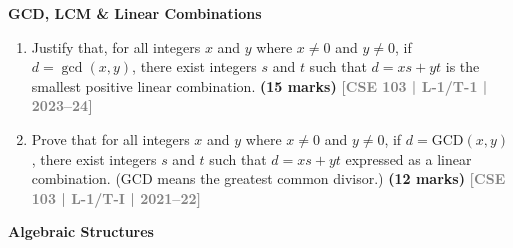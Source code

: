 \documentclass[12pt,a3paper]{article}
\newcommand{\yr}[1]{\hfill\textcolor{gray}{\small\textbf{[#1]}}}
\newcommand{\mk}[1]{\textcolor{orange!70!black}{\small\textbf{(#1 marks)}}}
\newcommand{\subtopic}[2]{%
  \vspace{10pt}
  \noindent\begin{tcolorbox}[colback=#1!8,colframe=#1,boxrule=0.6pt,arc=4pt,
    left=6pt,right=6pt,top=4pt,bottom=4pt]
    \small\bfseries\textcolor{#1}{#2}
  \end{tcolorbox}
  \vspace{2pt}
}
\begin{document}
\subtopic{cC}{GCD, LCM \& Linear Combinations}
\label{sub:s5-gcdlcm}

\begin{enumerate}

\item Justify that, for all integers $x$ and $y$ where $x \neq 0$ and $y \neq 0$, if $d = \gcd(x, y)$, there exist integers $s$ and $t$ such that $d = xs + yt$ is the smallest positive linear combination.
\mk{15} \yr{CSE 103 | L-1/T-1 | 2023--24}

\item Prove that for all integers $x$ and $y$ where $x \neq 0$ and $y \neq 0$, if $d = \text{GCD}(x,y)$, there exist integers $s$ and $t$ such that $d = xs + yt$ expressed as a linear combination. (GCD means the greatest common divisor.)
\mk{12} \yr{CSE 103 | L-1/T-I | 2021--22}

\end{enumerate}

\subtopic{cC}{Algebraic Structures}
\label{sub:s5-algebraic}
\end{document}
